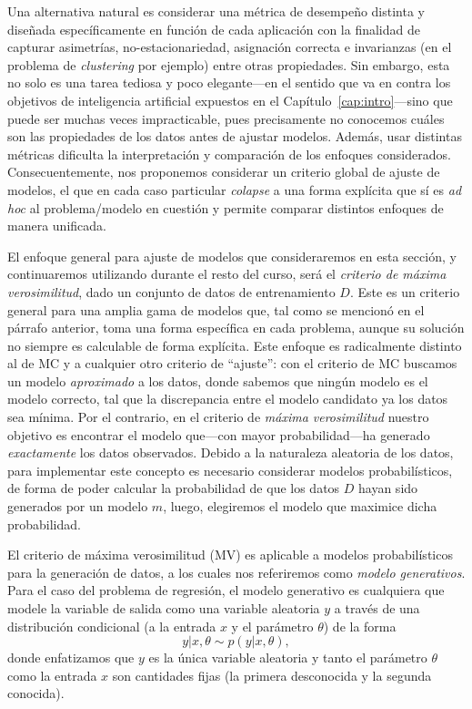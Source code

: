 Una alternativa natural es considerar una métrica de desempeño distinta y diseñada específicamente en función  de cada aplicación con la finalidad de capturar asimetrías, no-estacionariedad, asignación correcta e invarianzas (en el problema de \emph{clustering} por ejemplo) entre otras propiedades. Sin embargo, esta no solo es una tarea tediosa y poco elegante---en el sentido que va en contra los objetivos de inteligencia artificial expuestos en el Capítulo~\ref{cap:intro}---sino que puede ser muchas veces impracticable, pues precisamente no conocemos cuáles son las propiedades de los datos antes de ajustar modelos. Además, usar distintas métricas dificulta la interpretación y comparación de los enfoques considerados. Consecuentemente, nos proponemos considerar un criterio global de ajuste de modelos, el que en cada caso particular \emph{colapse} a una forma explícita que sí es \emph{ad hoc} al problema/modelo en cuestión y permite comparar distintos enfoques de manera unificada. 	

El enfoque general para ajuste de modelos que consideraremos en esta sección, y continuaremos utilizando durante el resto del curso, será el \emph{criterio  de máxima verosimilitud}, dado un conjunto de datos de entrenamiento $D$. Este es un criterio general para una amplia gama de modelos que, tal como se mencionó en el párrafo anterior, toma una  forma específica en cada problema, aunque su solución no siempre es calculable de forma explícita. Este enfoque es radicalmente distinto al de MC y a cualquier otro criterio de ``ajuste'': con el criterio de MC buscamos un modelo \emph{aproximado} a los datos, donde sabemos que ningún modelo es el modelo correcto, tal que la discrepancia entre el modelo candidato ya los datos sea mínima. Por el contrario, en el criterio de \emph{máxima verosimilitud} nuestro objetivo es encontrar el modelo que---con mayor probabilidad---ha generado \emph{exactamente} los datos observados. Debido a la naturaleza aleatoria de los datos, para implementar este concepto es necesario considerar modelos probabilísticos, de forma de poder calcular la probabilidad de que los datos $D$ hayan sido generados por un modelo $m$, luego, elegiremos  el modelo que maximice dicha probabilidad. 

El criterio de máxima verosimilitud (MV) es aplicable a modelos probabilísticos para la generación de datos, a los cuales nos referiremos como \emph{modelo generativos}. Para el caso del problema de regresión, el modelo generativo es cualquiera que modele la variable de salida como una variable aleatoria $y$ a través de una distribución condicional (a la entrada $x$ y el parámetro $\theta$) de la forma 
\begin{equation}
	y|x,\theta \sim p(y|x,\theta),\label{eq:mod_gen}
\end{equation}
donde enfatizamos que $y$ es  la única variable aleatoria y tanto el parámetro $\theta$ como la entrada $x$ son cantidades fijas (la primera desconocida y la segunda conocida).

